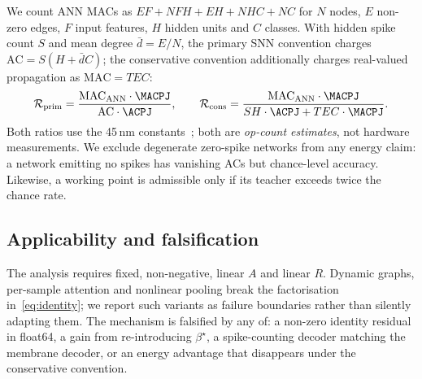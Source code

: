 We count ANN MACs as $EF + NFH + EH + NHC + NC$ for $N$ nodes, $E$ non-zero edges, $F$ input features, $H$ hidden units and $C$ classes. With hidden spike count $S$ and mean degree $\bar d = E/N$, the primary SNN convention charges
$\mathrm{AC} = S (H + \bar d C)$;
the conservative convention additionally charges real-valued propagation as $\mathrm{MAC}=T E C$:
\begin{equation}
\mathcal{R}_{\mathrm{prim}} = \frac{\mathrm{MAC}_{\mathrm{ANN}}\cdot\MACPJ}{\mathrm{AC}\cdot\ACPJ},\qquad
\mathcal{R}_{\mathrm{cons}} = \frac{\mathrm{MAC}_{\mathrm{ANN}}\cdot\MACPJ}{S H\cdot\ACPJ + T E C\cdot\MACPJ}.
\label{eq:energy}
\end{equation}
Both ratios use the 45\,nm constants~\cite{horowitz2014}; both are \emph{op-count estimates}, not hardware measurements. We exclude degenerate zero-spike networks from any energy claim: a network emitting no spikes has vanishing ACs but chance-level accuracy. Likewise, a working point is admissible only if its teacher exceeds twice the chance rate.

\subsection{Applicability and falsification}
\label{ssec:scope}

The analysis requires fixed, non-negative, linear $A$ and linear $R$. Dynamic graphs, per-sample attention and nonlinear pooling break the factorisation in~\eqref{eq:identity}; we report such variants as failure boundaries rather than silently adapting them. The mechanism is falsified by any of: a non-zero identity residual in float64, a gain from re-introducing $\beta^\star$, a spike-counting decoder matching the membrane decoder, or an energy advantage that disappears under the conservative convention.
